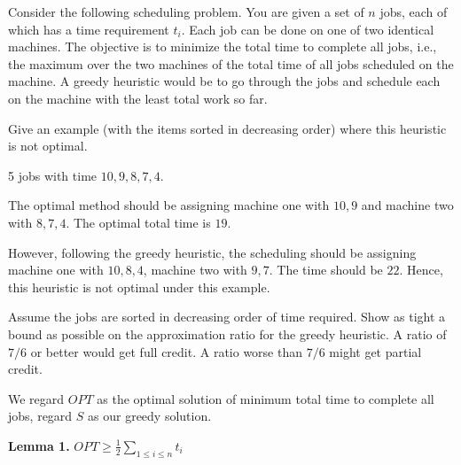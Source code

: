 \newpage
{} %

\problemdes

Consider the following scheduling problem. You are given a set of $n$ jobs, each of which has a time requirement $t_i$. Each job can be done on one of two identical machines. The objective is to minimize the total time to complete all jobs, i.e., the maximum over the two machines of the total time of all jobs scheduled on the machine. A greedy heuristic would be to go through the jobs and schedule each on the machine with the least total work so far.


Give an example (with the items sorted in decreasing order) where this heuristic is not optimal.






5 jobs with time $10, 9, 8, 7, 4$. 

The optimal method should be assigning machine one with $10, 9$ and machine two with $8, 7, 4$. The optimal total time is $19$.

However, following the greedy heuristic, the scheduling should be assigning machine one with $10, 8, 4$, machine two with $9, 7$. The time should be $22$. Hence, this heuristic is not optimal under this example.


Assume the jobs are sorted in decreasing order of time required. Show as tight a bound as possible on the approximation ratio for the greedy heuristic. A ratio of $7/6$ or better would get full credit. A ratio worse than $7/6$ might get partial credit.






We regard $OPT$ as the optimal solution of minimum total time to complete all jobs, regard $S$ as our greedy solution.

\textbf{Lemma 1.} $OPT \ge \frac{1}{2} \sum_{1 \le i \le n} t_i$

